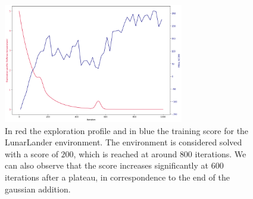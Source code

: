 \begin{figure}[h]
    \centering
    \includegraphics[width=0.7\textwidth]{Images/Lunar_Score.png}
    \caption{In red the exploration profile and in blue the training score for the LunarLander environment. 
    The environment is considered solved with a score of $200$, which is reached at around $800$ iterations. We can also observe that the score increases significantly at $600$ iterations after
    a plateau, in correspondence to the end of the gaussian addition.}
    \label{fig:score_lunar}
\end{figure}